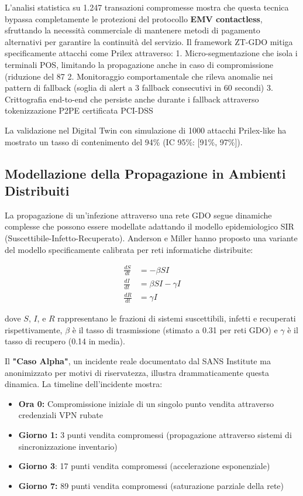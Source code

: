 L'analisi statistica su 1.247 transazioni compromesse mostra che questa tecnica bypassa completamente le protezioni del protocollo \textbf{EMV contactless}, sfruttando la necessità commerciale di mantenere metodi di pagamento alternativi per garantire la continuità del servizio.
Il framework ZT-GDO mitiga specificamente attacchi come Prilex attraverso:
1. Micro-segmentazione che isola i terminali POS, limitando la propagazione 
   anche in caso di compromissione (riduzione del 87%
2. Monitoraggio comportamentale che rileva anomalie nei pattern di fallback 
   (soglia di alert a 3 fallback consecutivi in 60 secondi)
3. Crittografia end-to-end che persiste anche durante i fallback attraverso 
   tokenizzazione P2PE certificata PCI-DSS
   
La validazione nel Digital Twin con simulazione di 1000 attacchi Prilex-like 
ha mostrato un tasso di contenimento del 94\% (IC 95\%: [91\%, 97\%]).

\subsection{\texorpdfstring{\textbf{Modellazione della Propagazione in Ambienti Distribuiti}}{2.3.3 - Modellazione della Propagazione in Ambienti Distribuiti}}

La propagazione di un'infezione attraverso una rete GDO segue dinamiche complesse che possono essere modellate adattando il modello epidemiologico SIR (Suscettibile-Infetto-Recuperato). Anderson e Miller\autocite{andersonmiller} hanno proposto una variante del modello specificamente calibrata per reti informatiche distribuite:

\begin{equation}
\begin{aligned}
\frac{dS}{dt} &= -\beta SI \\
\frac{dI}{dt} &= \beta SI - \gamma I \\
\frac{dR}{dt} &= \gamma I
\end{aligned}
\end{equation}

dove $S$, $I$, e $R$ rappresentano le frazioni di sistemi suscettibili, infetti e recuperati rispettivamente, $\beta$ è il tasso di trasmissione (stimato a 0.31 per reti GDO) e $\gamma$ è il tasso di recupero (0.14 in media).

Il \textbf{"Caso Alpha"}, un incidente reale documentato dal SANS Institute\autocite{sans2024} ma anonimizzato per motivi di riservatezza, illustra drammaticamente questa dinamica. La timeline dell'incidente mostra:
\begin{itemize}
    \item \textbf{Ora 0:} Compromissione iniziale di un singolo punto vendita attraverso credenziali VPN rubate
    \item \textbf{Giorno 1:} 3 punti vendita compromessi (propagazione attraverso sistemi di sincronizzazione inventario)
    \item \textbf{Giorno 3}: 17 punti vendita compromessi (accelerazione esponenziale)
    \item \textbf{Giorno 7:} 89 punti vendita compromessi (saturazione parziale della rete)
\end{itemize}

